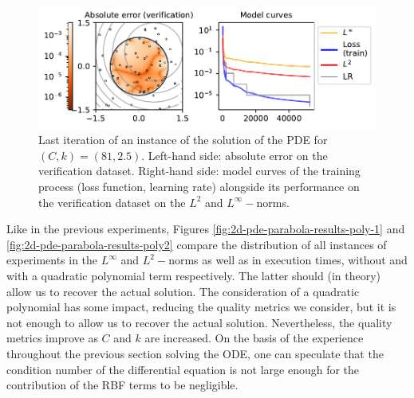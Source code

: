 \documentclass[12pt]{report} %
\begin{document}
\begin{figure}[h]
  \includegraphics[width=\textwidth]{imagenes/experiments/2d/pde_parabola/parabola-TR15-C81-rrrrepetishon-E52502.pdf}
  \caption{Last iteration of an instance of the solution of the PDE for $(C,k)=(81,2.5)$. Left-hand side: absolute error on the verification dataset. Right-hand side: model curves of the training process (loss function, learning rate) alongside its performance on the verification dataset on the $L^2$ and $L^\infty-$norms.}
  \label{fig:2d-pde-usual-result}
\end{figure}

Like in the previous experiments, Figures \ref{fig:2d-pde-parabola-results-poly-1} and \ref{fig:2d-pde-parabola-results-poly2} compare the distribution of all instances of experiments in the $L^\infty$ and $L^2-$norms as well as in execution times, without and with a quadratic polynomial term respectively. The latter should (in theory) allow us to recover the actual solution. The consideration of a quadratic polynomial has some impact, reducing the quality metrics we consider, but it is not enough to allow us to recover the actual solution. Nevertheless, the quality metrics improve as $C$ and $k$ are increased. On the basis of the experience throughout the previous section solving the ODE, one can speculate that the condition number of the differential equation is not large enough for the contribution of the RBF terms to be negligible.
\end{document}
